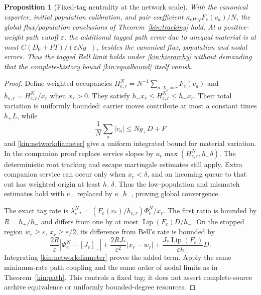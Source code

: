 \documentclass[11pt,oneside,openany]{book}
\newtheorem{proposition}[theorem]{Proposition}
\theoremstyle{definition}
\theoremstyle{remark}\newtheorem{remark}[theorem]{Remark}
\begin{document}
\begin{proposition}[Fixed-tag neutrality at the network scale]
\label{kin:networkneutrality}
With the canonical exporter, initial population calibration, and pair
coefficient $\kappa_e\mu_NF_e(v_a)/N$, the global flux/population conclusions
of Theorem~\ref{kin:tracking} hold. At a positive-weight path cutoff
$\varepsilon$, the additional tagged path error due to unequal material is
at most $C(D_0+FT)/(\varepsilon Ng_-)$, besides the canonical flux,
population and nodal errors. Thus the tagged Bell limit holds under
\eqref{kin:hierarchy} without demanding that the complete-history bound
\eqref{kin:equalbound} itself vanish.
\end{proposition}
\begin{proof}
Define weighted occupancies
$H_{e,r}^N=N^{-1}\sum_{a:X_a=r}F_e(v_a)$ and
$\bar h_{e,r}=H_{e,r}^N/x_r$ when $x_r>0$.
They satisfy $h_-x_r\le H_{e,r}^N\le h_+x_r$. Their total variation is
uniformly bounded: carrier moves contribute at most a constant times
$h_+L$, while
\[
 \frac1N\sum_a|\dot v_a|\le Ng_+D+F
\]
and \eqref{kin:networkdiameter} give a uniform integrated bound for
material variation. In the companion proof replace service slopes by
$\kappa_e\max(H_{e,r}^N,h_-\delta)$. The deterministic root tracking and
escape martingale estimates still apply. Extra companion service can occur
only when $x_r<\delta$, and an incoming queue to that cut has weighted
origin at least $h_-\delta$. Thus the low-population and mismatch estimates
hold with $\kappa_-$ replaced by $\kappa_-h_-$, proving global convergence.

The exact tag rate is
$\lambda_{e,*}^N=(F_e(v_*)/\bar h_{e,r})\Phi_e^N/x_r$.
The first ratio is bounded by $R=h_+/h_-$ and differs from one by at most
$\operatorname{Lip}(F_e)D/h_-$. On the stopped region $w_r\ge\varepsilon$,
$x_r\ge\varepsilon/2$, its difference from Bell's rate is bounded by
\[
 \frac{2R}{\varepsilon}|\Phi_e^N-[J_e]_+|
 +\frac{2RJ_*}{\varepsilon^2}|x_r-w_r|
 +\frac{J_*\operatorname{Lip}(F_e)}{\varepsilon h_-}D.
\]
Integrating \eqref{kin:networkdiameter} proves the added term. Apply the
same minimum-rate path coupling and the same order of nodal limits as in
Theorem~\ref{kin:path}. This controls a fixed tag; it does not assert
complete-source archive equivalence or uniformly bounded-degree resources.
\end{proof}
\end{document}
